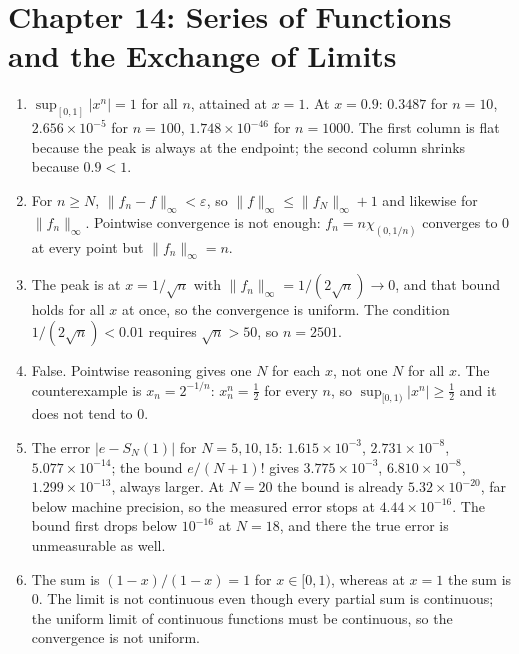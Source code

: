 \section*{Chapter 14: Series of Functions and the Exchange of Limits}
\begin{enumerate}[label=\textbf{14.\arabic*}]
  \item $\sup_{[0,1]}\lvert x^{n}\rvert=1$ for all $n$, attained at $x=1$.
        At $x=0.9$: $0.3487$ for $n=10$, $2.656\times10^{-5}$ for
        $n=100$, $1.748\times10^{-46}$ for $n=1000$. The first column is flat
        because the peak is always at the endpoint; the second column shrinks because $0.9<1$.

  \item For $n\ge N$, $\lVert f_{n}-f\rVert_{\infty}<\varepsilon$, so
        $\lVert f\rVert_{\infty}\le\lVert f_{N}\rVert_{\infty}+1$ and likewise
        for $\lVert f_{n}\rVert_{\infty}$. Pointwise convergence is not enough:
        $f_{n}=n\chi_{(0,1/n)}$ converges to $0$ at every point but
        $\lVert f_{n}\rVert_{\infty}=n$.

  \item The peak is at $x=1/\sqrt n$ with
        $\lVert f_{n}\rVert_{\infty}=1/(2\sqrt n)\to0$, and that bound holds
        for all $x$ at once, so the convergence is uniform. The condition
        $1/(2\sqrt n)<0.01$ requires $\sqrt n>50$, so $n=2501$.

  \item False. Pointwise reasoning gives one $N$ for each $x$, not
        one $N$ for all $x$. The counterexample is $x_{n}=2^{-1/n}$:
        $x_{n}^{n}=\tfrac12$ for every $n$, so
        $\sup_{[0,1)}\lvert x^{n}\rvert\ge\tfrac12$ and it does not tend to $0$.

  \item The error $\lvert e-S_{N}(1)\rvert$ for $N=5,10,15$:
        $1.615\times10^{-3}$, $2.731\times10^{-8}$,
        $5.077\times10^{-14}$; the bound $e/(N+1)!$ gives
        $3.775\times10^{-3}$, $6.810\times10^{-8}$,
        $1.299\times10^{-13}$, always larger. At $N=20$ the bound is already
        $5.32\times10^{-20}$, far below machine precision, so the measured error
        stops at $4.44\times10^{-16}$. The bound first drops below $10^{-16}$
        at $N=18$, and there the true error is unmeasurable as well.

  \item The sum is $(1-x)/(1-x)=1$ for $x\in[0,1)$, whereas at $x=1$ the
        sum is $0$. The limit is not continuous even though every partial sum is
        continuous; the uniform limit of continuous functions must be continuous, so
        the convergence is not uniform.


\end{enumerate}
